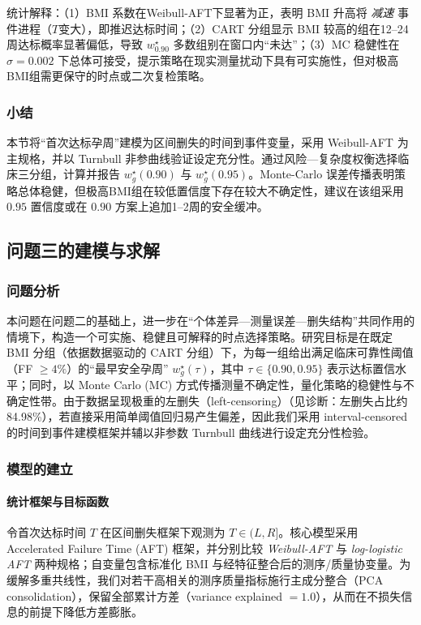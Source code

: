 \documentclass[withoutpreface]{cumcmthesis}
\begin{document}
统计解释：（1）BMI 系数在Weibull-AFT下显著为正，表明 BMI 升高将 \emph{减速} 事件进程（$T$变大），即推迟达标时间；（2）CART 分组显示 BMI 较高的组在12–24周达标概率显著偏低，导致 $w_{0.90}^{\star}$ 多数组别在窗口内“未达”；（3）MC 稳健性在 $\sigma=0.002$ 下总体可接受，提示策略在现实测量扰动下具有可实施性，但对极高BMI组需更保守的时点或二次复检策略。
\subsubsection{小结}
本节将“首次达标孕周”建模为区间删失的时间到事件变量，采用 Weibull-AFT 为主规格，并以 Turnbull 非参曲线验证设定充分性。通过风险—复杂度权衡选择临床三分组，计算并报告 $w_g^{\star}(0.90)$ 与 $w_g^{\star}(0.95)$。Monte-Carlo 误差传播表明策略总体稳健，但极高BMI组在较低置信度下存在较大不确定性，建议在该组采用 $0.95$ 置信度或在 $0.90$ 方案上追加1–2周的安全缓冲。

\subsection{问题三的建模与求解}
\subsubsection{问题分析}
本问题在问题二的基础上，进一步在“个体差异—测量误差—删失结构”共同作用的情境下，构造一个可实施、稳健且可解释的时点选择策略。研究目标是在既定 BMI 分组（依据数据驱动的 CART 分组）下，为每一组给出满足临床可靠性阈值（FF $\ge 4\%$）的“最早安全孕周” $w^{\star}_g(\tau)$，其中 $\tau\in\{0.90,0.95\}$ 表示达标置信水平；同时，以 
Monte Carlo (MC) 方式传播测量不确定性，量化策略的稳健性与不确定性带。由于数据呈现极重的左删失（left-censoring）（见诊断：左删失占比约 \num{84.98}\%），若直接采用简单阈值回归易产生偏差，因此我们采用 interval-censored 的时间到事件建模框架并辅以非参数 Turnbull 曲线进行设定充分性检验。

\subsubsection{模型的建立}
\paragraph{统计框架与目标函数} 令首次达标时间 $T$ 在区间删失框架下观测为 $T\in(L,R]$。核心模型采用 Accelerated Failure Time (AFT) 框架，并分别比较 \emph{Weibull-AFT} 与 \emph{log-logistic AFT} 两种规格；自变量包含标准化 BMI 与经特征整合后的测序/质量协变量。为缓解多重共线性，我们对若干高相关的测序质量指标施行主成分整合（PCA consolidation），保留全部累计方差（variance explained $=1.0$），从而在不损失信息的前提下降低方差膨胀。
\end{document}
